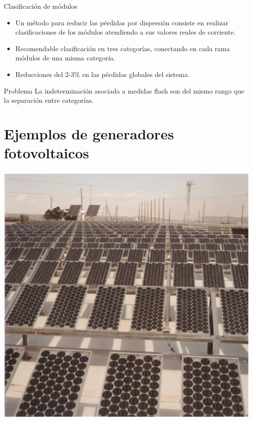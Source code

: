 \documentclass[xcolor={usenames,svgnames,dvipsnames}]{beamer}
\begin{document}
\begin{frame}[label={sec:orgf067bae}]{Clasificación de módulos}
\begin{itemize}
\item Un \alert{método para reducir las pérdidas por dispersión} consiste en \alert{realizar clasificaciones} de los módulos atendiendo a sus valores reales de corriente.

\item Recomendable clasificación en \alert{tres categorías}, conectando en cada rama módulos de una misma categoría.

\item Reducciones del 2-3\% en las pérdidas globales del sistema.
\end{itemize}

\begin{block}{Problema}
\alert{La indeterminación asociada a medidas \guillemotleft{}flash\guillemotright{} son del mismo rango que la separación entre categorías.}
\end{block}
\end{frame}


\section{Ejemplos de generadores fotovoltaicos}
\label{sec:org0897695}

\begin{frame}[label={sec:org6f52421}]{}
\begin{center}
\includegraphics[width=.9\linewidth]{../figs/Bifacial.jpg}
\end{center}
\end{frame}
\end{document}
